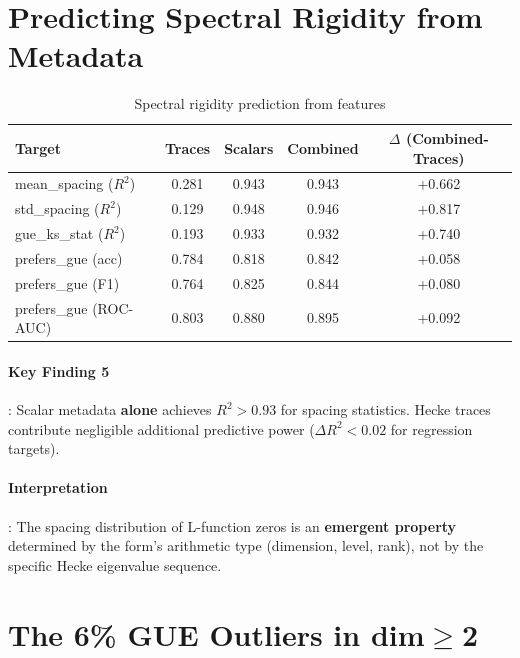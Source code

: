 \documentclass[11pt, a4paper]{article}
\newcommand{\GUE}{\textsc{GUE}}
\begin{document}
\section{Predicting Spectral Rigidity from Metadata}
\label{sec:task5}

\begin{table}[h]
\centering
\caption{Spectral rigidity prediction from features}
\label{tab:spectral_rigidity}
\begin{tabular}{lcccc}
\toprule
Target & Traces & Scalars & Combined & $\Delta$ (Combined-Traces) \\ \midrule
mean\_spacing ($R^2$) & 0.281 & 0.943 & 0.943 & +0.662 \\
std\_spacing ($R^2$) & 0.129 & 0.948 & 0.946 & +0.817 \\
gue\_ks\_stat ($R^2$) & 0.193 & 0.933 & 0.932 & +0.740 \\ \midrule
prefers\_gue (acc) & 0.784 & 0.818 & 0.842 & +0.058 \\
prefers\_gue (F1) & 0.764 & 0.825 & 0.844 & +0.080 \\
prefers\_gue (ROC-AUC) & 0.803 & 0.880 & 0.895 & +0.092 \\ \bottomrule
\end{tabular}
\end{table}

\paragraph{Key Finding 5}: Scalar metadata {\bfseries alone} achieves $R^2>0.93$ for spacing statistics. Hecke traces contribute negligible additional predictive power ($\Delta R^2<0.02$ for regression targets).

\paragraph{Interpretation}: The spacing distribution of L-function zeros is an {\bfseries emergent property} determined by the form's arithmetic type (dimension, level, rank), not by the specific Hecke eigenvalue sequence.

\section{The 6\% \GUE{} Outliers in dim$\geq$2}
\label{sec:outliers}
\end{document}
